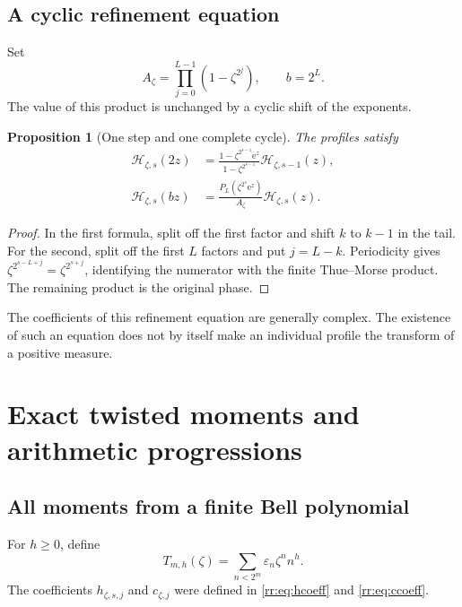 \documentclass[11pt,a4paper,oneside,openany]{book}
\numberwithin{equation}{chapter}
\newtheorem{proposition}[theorem]{Proposition}
\theoremstyle{definition}
\theoremstyle{remark}
\newcommand{\eps}{\varepsilon}
\newcommand{\e}{\mathrm e}
\newcommand{\Hp}{\mathcal H}
\begin{document}
\section{A cyclic refinement equation}
Set
\begin{equation}
 A_\zeta=\prod_{j=0}^{L-1}(1-\zeta^{2^j}),\qquad b=2^L.
 \label{rr:eq:Acycle}
\end{equation}
The value of this product is unchanged by a cyclic shift of the exponents.

\begin{proposition}[One step and one complete cycle]
The profiles satisfy
\begin{align}
 \Hp_{\zeta,s}(2z)
 &=\frac{1-\zeta^{2^{s-1}}\e^z}{1-\zeta^{2^{s-1}}}
     \Hp_{\zeta,s-1}(z),\label{rr:eq:onestep}\\
 \Hp_{\zeta,s}(bz)
 &=\frac{P_L(\zeta^{2^s}\e^z)}{A_\zeta}\Hp_{\zeta,s}(z).
 \label{rr:eq:cycle}
\end{align}
\end{proposition}
\begin{proof}
In the first formula, split off the first factor and shift \(k\) to \(k-1\) in the tail. For the second, split off the first \(L\) factors and put \(j=L-k\). Periodicity gives \(\zeta^{2^{s-L+j}}=\zeta^{2^{s+j}}\), identifying the numerator with the finite Thue--Morse product. The remaining product is the original phase.
\end{proof}
The coefficients of this refinement equation are generally complex. The existence of such an equation does not by itself make an individual profile the transform of a positive measure.
\chapter{Exact twisted moments and arithmetic progressions}
\label{rr:sec:moments}

\section{All moments from a finite Bell polynomial}
For \(h\geq0\), define
\begin{equation}
 T_{m,h}(\zeta)=\sum_{n<2^m}\eps_n\zeta^n n^h.
 \label{rr:eq:Tmoment}
\end{equation}
The coefficients \(h_{\zeta,s,j}\) and \(c_{\zeta,j}\) were defined in \eqref{rr:eq:hcoeff} and \eqref{rr:eq:ccoeff}.
\end{document}
